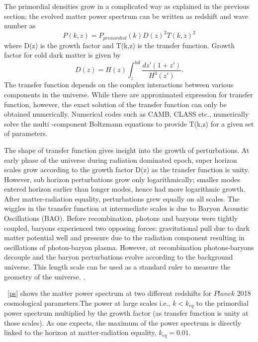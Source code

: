 The primordial densities grow in a complicated way as explained in the previous section; the evolved matter power spectrum can be written as redshift and wave number as
\begin{equation}
P(k,z) = P_{primordial} (k) D(z)^{2} T(k,z)^{2}
\end{equation}
where D(z) is the growth factor and T(k,z) is the transfer function. 
Growth factor for cold dark matter is given by
\begin{equation}
D(z) = H(z) \int^{\inf}_{z} \frac{dz'(1+z')}{H^{3}(z')}.
\end{equation}
The transfer function depends on the complex interactions between various components in the universe. 
While there are approximated expression for transfer function, however, the exact solution of the transfer function can only be obtained numerically. 
Numerical codes such as CAMB, CLASS etc., numerically solve the multi -component Boltzmann equations to provide T(k,z) for a given set of parameters. 

The shape of transfer function gives insight into the growth of perturbations. At early phase of the universe during radiation dominated epoch, super horizon scales grow according to the growth factor D(z) as the transfer function is unity. However, sub horizon perturbations grow only logarithmically; smaller modes entered horizon earlier than longer modes, hence had more logarithmic growth. After matter-radiation equality, perturbations grew equally on all scales. The wiggles in the transfer function at intermediate scales is due to Baryon Acoustic Oscillations (BAO). Before recombination, photons and baryons were tightly coupled, baryons experienced two opposing forces: gravitational pull due to dark matter potential well and pressure due to the radiation component resulting in oscillations of photon-baryon plasma. However, at recombination photons-baryons decouple and the baryon perturbations evolve according to the background universe. This length scale can be used as a standard ruler to measure the geometry of the universe. .

~\ref{ps} shows the matter power spectrum at two different redshifts for $Planck$ 2018 cosmological parameters.The power at large scales i.e., $k<k_{eq}$ to the primordial power spectrum multiplied by the growth factor (as transfer function is unity at those scales). As one expects, the maximum of the power spectrum is directly linked to the horizon at matter-radiation equality, $k_{eq} = 0.01$.  

